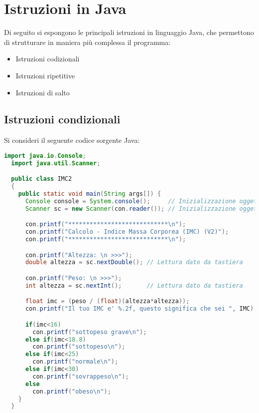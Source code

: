 \documentclass[a4paper]{extarticle}
\begin{document}
\newpage
\section{Istruzioni in Java}
Di seguito si espongono le principali istruzioni in linguaggio Java, che permettono di strutturare in maniera più complessa il programma:
\begin{itemize}
  \item Istruzioni codizionali
  \item Istruzioni ripetitive
  \item Istruzioni di salto
\end{itemize}

\vspace{1em}
\subsection{Istruzioni condizionali}
Si consideri il seguente codice sorgente Java:

\vspace{1em}
\noindent
\begin{lstlisting}[language=Java, caption=Esempio istruzione condiziale in Java]
  import java.io.Console;
  import java.util.Scanner;

  public class IMC2
  {
    public static void main(String args[]) {
      Console console = System.console();     // Inizializzazione oggetto Console
      Scanner sc = new Scanner(con.reader()); // Inizializzazione oggetto Scanner

      con.printf("****************************\n");
      con.printf("Calcolo - Indice Massa Corporea (IMC) (V2)");
      con.printf("****************************\n");

      con.printf("Altezza: \n >>>");
      double altezza = sc.nextDouble(); // Lettura dato da tastiera

      con.printf("Peso: \n >>>");
      int altezza = sc.nextInt();       // Lettura dato da tastiera

      float imc = (peso / (float)(altezza*altezza));
      con.printf("Il tuo IMC e' %.2f, questo significa che sei ", IMC);

      if(imc<16)
        con.printf("sottopeso grave\n");
      else if(imc<18.8)
        con.printf("sottopeso\n");
      else if(imc<25)
        con.printf("normale\n");
      else if(imc<30)
        con.printf("sovrappeso\n");
      else
        con.printf("obeso\n");
    }
  }
\end{lstlisting}
\end{document}
